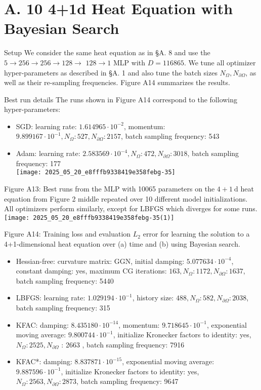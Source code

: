 \documentclass[10pt]{article}
\begin{document}
\section*{A. 10 4+1d Heat Equation with Bayesian Search}
Setup We consider the same heat equation as in §A. 8 and use the $5 \rightarrow 256 \rightarrow 256 \rightarrow 128 \rightarrow$ $128 \rightarrow 1$ MLP with $D=116865$. We tune all optimizer hyper-parameters as described in §A. 1 and also tune the batch sizes $N_{\Omega}, N_{\partial \Omega}$, as well as their re-sampling frequencies. Figure A14 summarizes the results.

Best run details The runs shown in Figure A14 correspond to the following hyper-parameters:

\begin{itemize}
  \item SGD: learning rate: $1.614965 \cdot 10^{-2}$, momentum: $9.899167 \cdot 10^{-1}, N_{\Omega}: 527, N_{\partial \Omega}: 2157$, batch sampling frequency: 543
  \item Adam: learning rate: $2.583569 \cdot 10^{-4}, N_{\Omega}: 472, N_{\partial \Omega}: 3018$, batch sampling frequency: 177\\
\texttt{[image: 2025\_05\_20\_e8fffb9338419e358febg-35]}
\end{itemize}

Figure A13: Best runs from the MLP with 10065 parameters on the $4+1 \mathrm{~d}$ heat equation from Figure 2 middle repeated over 10 different model initializations. All optimizers perform similarly, except for LBFGS which diverges for some runs.\\
\texttt{[image: 2025\_05\_20\_e8fffb9338419e358febg-35(1)]}

Figure A14: Training loss and evaluation $L_{2}$ error for learning the solution to a 4+1-dimensional heat equation over (a) time and (b) using Bayesian search.

\begin{itemize}
  \item Hessian-free: curvature matrix: GGN, initial damping: $5.077634 \cdot 10^{-4}$, constant damping: yes, maximum CG iterations: $163, N_{\Omega}: 1172, N_{\partial \Omega}: 1637$, batch sampling frequency: 5440
  \item LBFGS: learning rate: $1.029194 \cdot 10^{-1}$, history size: $488, N_{\Omega}: 582, N_{\partial \Omega}: 2038$, batch sampling frequency: 315
  \item KFAC: damping: $8.435180 \cdot 10^{-14}$, momentum: $9.718645 \cdot 10^{-1}$, exponential moving average: $9.800744 \cdot 10^{-1}$, initialize Kronecker factors to identity: yes, $N_{\Omega}: 2525, N_{\partial \Omega}$ : 2663 , batch sampling frequency: 7916
  \item KFAC*: damping: $8.837871 \cdot 10^{-15}$, exponential moving average: $9.887596 \cdot 10^{-1}$, initialize Kronecker factors to identity: yes, $N_{\Omega}: 2563, N_{\partial \Omega}: 2873$, batch sampling frequency: 9647
\end{itemize}
\end{document}

